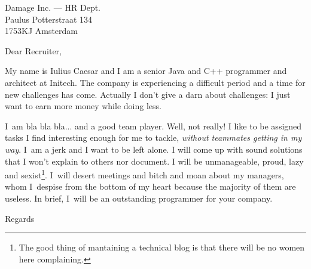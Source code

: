 \documentclass[alternate,letterpaper,pagesize,UScommercial9]{scrlttr2}
\begin{document}
\begin{letter}{%
       Damage Inc. --- HR Dept.\\%
       Paulus Potterstraat 134\\%
       1753KJ Amsterdam\\
}
\opening{Dear Recruiter,}   

My name is Iulius Caesar and I am a senior Java and C++ programmer and architect at Initech. The company is experiencing a difficult period and a time for new challenges has come. Actually I don't give a darn about challenges: I just want to earn more money while doing less.

I~am bla bla bla... and a good team player. Well, not really! I like to be assigned tasks I find interesting enough for me to tackle, \textit{without teammates getting in my way}. I~am a jerk and I want to be left alone. I will come up with sound solutions that I won't explain to others nor document. I will be unmanageable, proud, lazy and sexist\footnote{The good thing of mantaining a technical blog is that there will be no women here complaining.}. I~will desert meetings and bitch and moan about my managers, whom I~despise from the bottom of my heart because the majority of them are useless. In brief, I~will be an outstanding programmer for your company. 
       
\closing{Regards}


\end{letter}
\end{document}
